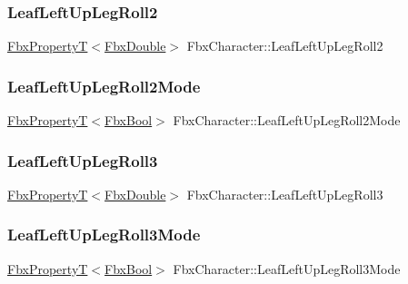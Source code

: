 \subsubsection{\texorpdfstring{Leaf\+Left\+Up\+Leg\+Roll2}{LeafLeftUpLegRoll2}}
{\footnotesize\ttfamily \hyperlink{class_fbx_property_t}{Fbx\+PropertyT}$<$\hyperlink{fbxtypes_8h_a171e72a1c46fc15c1a6c9c31948c1c5b}{Fbx\+Double}$>$ Fbx\+Character\+::\+Leaf\+Left\+Up\+Leg\+Roll2}

\mbox{\label{class_fbx_character_aec26440a6eb3ddf1451bca2a9c09ac21}} 
\subsubsection{\texorpdfstring{Leaf\+Left\+Up\+Leg\+Roll2\+Mode}{LeafLeftUpLegRoll2Mode}}
{\footnotesize\ttfamily \hyperlink{class_fbx_property_t}{Fbx\+PropertyT}$<$\hyperlink{fbxtypes_8h_a92e0562b2fe33e76a242f498b362262e}{Fbx\+Bool}$>$ Fbx\+Character\+::\+Leaf\+Left\+Up\+Leg\+Roll2\+Mode}

\mbox{\label{class_fbx_character_abebd72ca2e28adad945143805f05b56b}} 
\subsubsection{\texorpdfstring{Leaf\+Left\+Up\+Leg\+Roll3}{LeafLeftUpLegRoll3}}
{\footnotesize\ttfamily \hyperlink{class_fbx_property_t}{Fbx\+PropertyT}$<$\hyperlink{fbxtypes_8h_a171e72a1c46fc15c1a6c9c31948c1c5b}{Fbx\+Double}$>$ Fbx\+Character\+::\+Leaf\+Left\+Up\+Leg\+Roll3}

\mbox{\label{class_fbx_character_a21b83a15b1e9251f7c0dd8cf7b05f10f}} 
\subsubsection{\texorpdfstring{Leaf\+Left\+Up\+Leg\+Roll3\+Mode}{LeafLeftUpLegRoll3Mode}}
{\footnotesize\ttfamily \hyperlink{class_fbx_property_t}{Fbx\+PropertyT}$<$\hyperlink{fbxtypes_8h_a92e0562b2fe33e76a242f498b362262e}{Fbx\+Bool}$>$ Fbx\+Character\+::\+Leaf\+Left\+Up\+Leg\+Roll3\+Mode}


